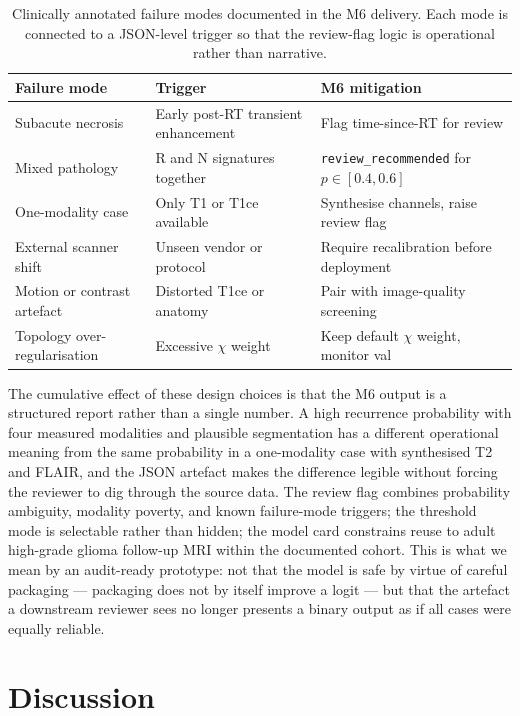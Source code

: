 \documentclass[11pt,a4paper]{article}
\begin{document}
\begin{table}[t]
\centering
\caption{Clinically annotated failure modes documented in the M6 delivery. Each mode is connected to a JSON-level trigger so that the review-flag logic is operational rather than narrative.}
\label{tab:m6failures}
\small
\begin{tabular}{lll}
\toprule
Failure mode & Trigger & M6 mitigation \\
\midrule
Subacute necrosis & Early post-RT transient enhancement & Flag time-since-RT for review \\
Mixed pathology & R and N signatures together & \texttt{review\_recommended} for $p\in[0.4,0.6]$ \\
One-modality case & Only T1 or T1ce available & Synthesise channels, raise review flag \\
External scanner shift & Unseen vendor or protocol & Require recalibration before deployment \\
Motion or contrast artefact & Distorted T1ce or anatomy & Pair with image-quality screening \\
Topology over-regularisation & Excessive $\chi$ weight & Keep default $\chi$ weight, monitor val \\
\bottomrule
\end{tabular}
\end{table}

The cumulative effect of these design choices is that the M6 output is a structured report rather than a single number. A high recurrence probability with four measured modalities and plausible segmentation has a different operational meaning from the same probability in a one-modality case with synthesised T2 and FLAIR, and the JSON artefact makes the difference legible without forcing the reviewer to dig through the source data. The review flag combines probability ambiguity, modality poverty, and known failure-mode triggers; the threshold mode is selectable rather than hidden; the model card constrains reuse to adult high-grade glioma follow-up MRI within the documented cohort. This is what we mean by an audit-ready prototype: not that the model is safe by virtue of careful packaging --- packaging does not by itself improve a logit --- but that the artefact a downstream reviewer sees no longer presents a binary output as if all cases were equally reliable.

\section{Discussion}
\end{document}
